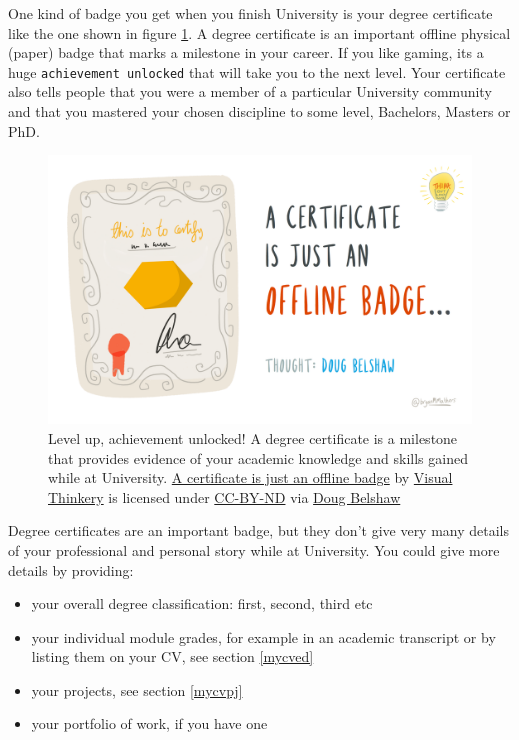 \documentclass[
]{book}
\providecommand{\tightlist}{%
  \setlength{\itemsep}{0pt}\setlength{\parskip}{0pt}}
\begin{document}
One kind of badge you get when you finish University is your degree certificate like the one shown in figure \ref{fig:degree-cert-fig}. A degree certificate is an important offline physical (paper) badge that marks a milestone in your career. If you like gaming, its a huge \texttt{achievement\ unlocked} that will take you to the next level. Your certificate also tells people that you were a member of a particular University community and that you mastered your chosen discipline to some level, Bachelors, Masters or PhD.

\begin{figure}

{\centering \includegraphics[width=1\linewidth]{images/a-certificate-is-just-a-badge} 

}

\caption{Level up, achievement unlocked! A degree certificate is a milestone that provides evidence of your academic knowledge and skills gained while at University. \href{https://bryanmmathers.com/a-certificate-is-just-an-offline-badge/}{A certificate is just an offline badge} by \href{https://visualthinkery.com/}{Visual Thinkery} is licensed under \href{https://creativecommons.org/licenses/by-nd/4.0/}{CC-BY-ND} via \href{https://dougbelshaw.com/}{Doug Belshaw}}\label{fig:degree-cert-fig}
\end{figure}



Degree certificates are an important badge, but they don't give very many details of your professional and personal story while at University. You could give more details by providing:

\begin{itemize}
\tightlist
\item
  your overall degree classification: first, second, third etc
\item
  your individual module grades, for example in an academic transcript or by listing them on your CV, see section \ref{mycved}
\item
  your projects, see section \ref{mycvpj}
\item
  your portfolio of work, if you have one
\end{itemize}
\end{document}
